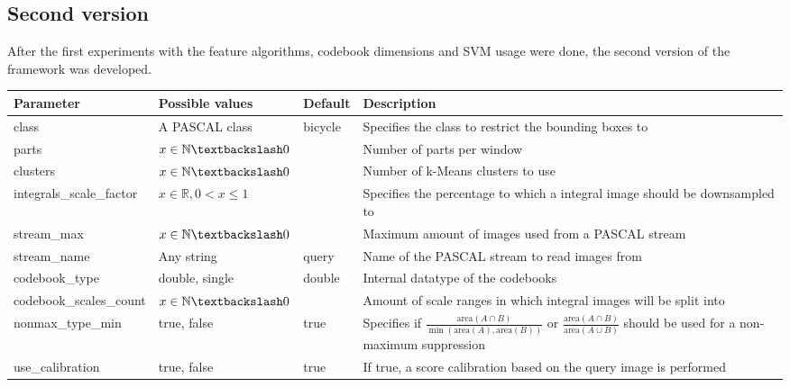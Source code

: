 \subsection{Second version}

After the first experiments with the feature algorithms, codebook dimensions and \ac{SVM} usage were done, the second version of the framework was developed.

\begin{longtable}{%
|%
p{}%
|%
>{\raggedright\arraybackslash}%
p{}%
|%
>{\raggedright\arraybackslash}%
p{}%
|%
>{\raggedright\arraybackslash}%
p{}%
|%
}
\hline \textbf{Parameter} & \textbf{Possible values} & \textbf{Default} & \textbf{Description} \\ 
\hline
\hline class & A PASCAL class & bicycle & Specifies the class to restrict the bounding boxes to \\ 
\hline parts & $x \in \mathbb{N} \textbackslash 0$ & 4 & Number of parts per window \\ 
\hline clusters & $x \in \mathbb{N} \textbackslash 0$ & 1000 & Number of k-Means clusters to use \\ 
\hline integrals\allowbreak\_scale\allowbreak\_factor & $x \in \mathbb{R}, 0 < x \le 1$ & 1 & Specifies the percentage to which a integral image should be downsampled to \\ 
\hline stream\allowbreak\_max & $x \in \mathbb{N} \textbackslash 0$ & 100 & Maximum amount of images used from a PASCAL stream \\ 
\hline stream\allowbreak\_name & Any string & query & Name of the PASCAL stream to read images from \\ 
\hline codebook\allowbreak\_type & double, single & double & Internal datatype of the codebooks \\ 
\hline codebook\allowbreak\_scales\allowbreak\_count & $x \in \mathbb{N} \textbackslash 0$ & 3 & Amount of scale ranges in which integral images will be split into \\ 
\hline nonmax\allowbreak\_type\allowbreak\_min & true, false & true & Specifies if $\frac{\text{area}(A \cap B)}{\min(\text{area}(A), \text{area}(B))}$ or $\frac{\text{area}(A \cap B)}{\text{area}(A \cup B)}$ should be used for a non-maximum suppression \\ 
\hline use\allowbreak\_calibration & true, false & true & If true, a score calibration based on the query image is performed \\ 

\end{longtable}
